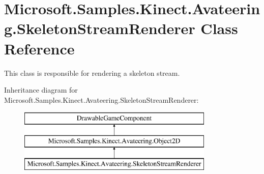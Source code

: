 \hypertarget{class_microsoft_1_1_samples_1_1_kinect_1_1_avateering_1_1_skeleton_stream_renderer}{\section{Microsoft.\+Samples.\+Kinect.\+Avateering.\+Skeleton\+Stream\+Renderer Class Reference}
\label{class_microsoft_1_1_samples_1_1_kinect_1_1_avateering_1_1_skeleton_stream_renderer}
}


This class is responsible for rendering a skeleton stream.  


Inheritance diagram for Microsoft.\+Samples.\+Kinect.\+Avateering.\+Skeleton\+Stream\+Renderer\+:\begin{figure}[H]
\begin{center}
\leavevmode
\includegraphics[height=3.000000cm]{class_microsoft_1_1_samples_1_1_kinect_1_1_avateering_1_1_skeleton_stream_renderer}
\end{center}
\end{figure}

